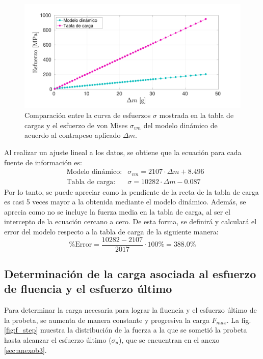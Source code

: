\begin{figure}[h]
\centering
\includegraphics[width=1\linewidth, trim={1cm 0cm 2cm 0cm},clip]{Imagenes/comp_modtab.pdf}
\caption{Comparación entre la curva de esfuerzos $\sigma$ mostrada en la tabla de cargas y el esfuerzo de von Mises $\sigma_{vm}$ del modelo dinámico de acuerdo al contrapeso aplicado $\Delta m$.}
\label{fig:comp_modtab}
\end{figure}

Al realizar un ajuste lineal a los datos, se obtiene que la ecuación para cada fuente de información es:
\begin{align}
	&\text{Modelo dinámico:}& \sigma_{vm} = 2107\cdot \Delta m + 8.496 \\
	&\text{Tabla de carga:} & \sigma = 10282\cdot \Delta m - 0.087 
\end{align}
Por lo tanto, se puede apreciar como la pendiente de la recta de la tabla de carga es casi 5 veces mayor a la obtenida mediante el modelo dinámico. Además, se aprecia como no se incluye la fuerza media en la tabla de carga, al ser el intercepto de la ecuación cercano a cero. De esta forma, se definirá y calculará el error del modelo respecto a la tabla de carga de la siguiente manera:
\begin{equation}
	\text{\% Error} = \frac{10282 - 2107}{2017} \cdot 100\% = 388.0 \%
\end{equation}

\subsection{Determinación de la carga asociada al esfuerzo de fluencia y el esfuerzo último}

Para determinar la carga necesaria para lograr la fluencia y el esfuerzo último de la probeta, se aumenta de manera constante y progresiva la carga $F_{max}$. La fig. \ref{fig:f_step} muestra la distribución de la fuerza a la que se sometió la probeta hasta alcanzar el esfuerzo último ($\sigma_u$), que se encuentran en el anexo \ref{sec:anexob3}.

